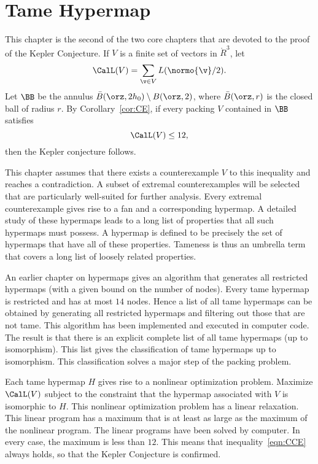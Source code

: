 

\chapter{Tame Hypermap}
%

\label{sec:tame}
%

\begin{summary}
  This chapter is the second of the two core chapters that are devoted
  to the proof of the Kepler Conjecture.  If $V$ is a finite set of
  vectors in $\ring{R}^3$, let
  \begin{displaymath}\CalL(V) = \sum_{\v\in V}
    L(\normo{\v}/2).\end{displaymath}
Let $\BB$ be the
annulus $\bar B(\orz,2h_0)\setminus B(\orz,2)$, where
$\bar B(\orz,r)$ is the closed ball of radius $r$.
By Corollary~\ref{cor:CE}, if every packing $V$
contained in $\BB$
satisfies
\begin{equation}\label{eqn:CCE}
\CalL(V) \le 12,
\end{equation}
then the Kepler conjecture follows.

This chapter assumes that there exists a counterexample $V$ to this
inequality and reaches a contradiction.  A subset of extremal
counterexamples will be selected that are particularly well-suited for
further analysis.  Every extremal counterexample gives rise to a fan
and a corresponding hypermap.  A detailed study of these hypermaps
leads to a long list of properties that all such hypermaps must
possess.  A  hypermap is defined to be precisely the set
of hypermaps that have all of these properties.  Tameness is thus an
umbrella term that covers a long list of loosely related properties.

An earlier chapter on hypermaps gives an algorithm that generates all
restricted hypermaps (with a given bound on the number of nodes).
Every tame hypermap is restricted and has at most $14$ nodes.  Hence a
list of all tame hypermaps can be obtained by generating all
restricted hypermaps and filtering out those that are not tame.  This
algorithm has been implemented and executed in computer code.  The result
is that there is an explicit complete list of all tame hypermaps (up
to isomorphism).  This list gives the classification of tame hypermaps
up to isomorphism.  This classification solves a major step of the
packing problem.

Each tame hypermap $H$ gives rise to a nonlinear optimization problem.
Maximize $\CalL(V)$ subject to the constraint that the hypermap
associated with $V$ is isomorphic to $H$.  This nonlinear optimization
problem has a linear relaxation.  This linear program has a maximum
that is at least as large as the maximum of the nonlinear program.
The linear programs have been solved by computer.  In every case, the
maximum is less than $12$.  This means that inequality~\ref{eqn:CCE}
always holds, so that the Kepler Conjecture is confirmed.
\end{summary}
%
%



